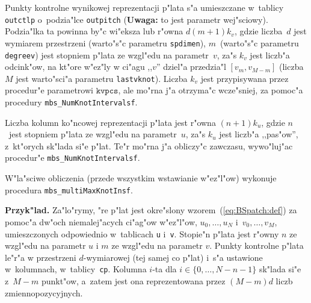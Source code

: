 \begin{sloppypar}
Punkty kontrolne wynikowej reprezentacji p"lata s"a umieszczane w~tablicy
\texttt{outctlp} o~podzia"lce \texttt{outpitch} (\textbf{Uwaga:} to jest
parametr wej"sciowy). Podzia"lka ta powinna by"c wi"eksza lub r"owna
$d(m+1)k_v$, gdzie liczba~$d$ jest wymiarem przestrzeni (warto"s"c parametru
\texttt{spdimen}), $m$~(warto"s"c parametru \texttt{degreev}) jest stopniem
p"lata ze wzgl"edu na parametr~$v$, za"s $k_v$ jest liczb"a odcink"ow, na
kt"ore w"ez"ly w ci"agu ,,$v$'' dziel"a przedzia"l $[v_m,v_{M-m}]$
(liczba $M$ jest warto"sci"a parametru \texttt{lastvknot}). Liczba $k_v$
jest przypisywana przez procedur"e parametrowi $\texttt{kvpcs}$, ale mo"rna
j"a otrzyma"c wcze"sniej, za pomoc"a procedury
\texttt{mbs\_NumKnotIntervalsf}.

Liczba kolumn ko"ncowej reprezentacji p"lata jest r"owna $(n+1)k_u$, gdzie
$n$~jest stopniem p"lata ze wzgl"edu na parametr~$u$, za"s $k_u$ jest
liczb"a ,,pas"ow'', z~kt"orych sk"lada si"e p"lat. Te"r mo"rna j"a obliczy"c
zawczasu, wywo"luj"ac procedur"e \texttt{mbs\_NumKnotIntervalsf}.
\end{sloppypar}

W"la"sciwe obliczenia (przede wszystkim wstawianie w"ez"l"ow) wykonuje
procedura \texttt{mbs\_multiMaxKnotInsf}.


\vspace{\medskipamount}\noindent
\textbf{Przyk"lad.} 
Za"lo"rymy, "re p"lat jest okre"slony wzorem~(\ref{eq:BSpatch:def}) za
pomoc"a dw"och niemalej"acych ci"ag"ow w"ez"l"ow, $u_0,\ldots,u_N$
i~$v_0,\ldots,v_M$, umieszczonych odpowiednio w~tablicach \texttt{u}
i~\texttt{v}. Stopie"n p"lata jest r"owny $n$ ze
wzgl"edu na parametr $u$ i $m$ ze wzgl"edu na parametr $v$.
Punkty kontrolne p"lata le"r"a w przestrzeni $d$-wymiarowej (tej samej co
p"lat) i~s"a ustawione w~kolumnach, w~tablicy~\texttt{cp}. Kolumna $i$-ta dla
$i\in\{0,\ldots,N-n-1\}$ sk"lada si"e z~$M-m$ punkt"ow, a~zatem jest ona
reprezentowana przez $(M-m)d$ liczb zmiennopozycyjnych.

\vspace{\medskipamount}
\vspace{\medskipamount}

